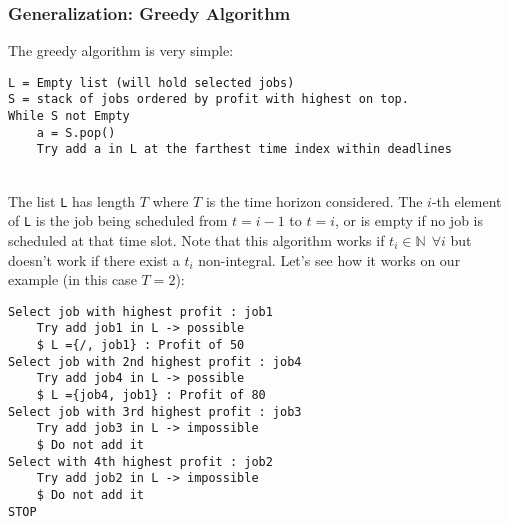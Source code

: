 %

\subsubsection{Generalization: Greedy Algorithm}

The greedy algorithm is very simple: \\[-5pt]

\begin{lstlisting}[style=pseudo]
L = Empty list (will hold selected jobs)
S = stack of jobs ordered by profit with highest on top.
While S not Empty
	a = S.pop()
	Try add a in L at the farthest time index within deadlines
\end{lstlisting} ~\\[-1.3cm]
The list \texttt{L} has length $T$ where $T$ is the time horizon considered. The $i$-th element of \texttt{L} is the job being scheduled from $t = i-1$ to $t = i$, or is empty if no job is scheduled at that time slot. Note that this algorithm works if $t_i \in \mathbb{N} \: \: \forall i$ but doesn’t work if there exist a $t_i$ non-integral. Let's see how it works on our example (in this case $T = 2$):

\vspace{-0.5cm}
\begin{lstlisting}[style=Classic]
Select job with highest profit : job1
	Try add job1 in L -> possible
	$ L ={/, job1} : Profit of 50
Select job with 2nd highest profit : job4
	Try add job4 in L -> possible
	$ L ={job4, job1} : Profit of 80
Select job with 3rd highest profit : job3
	Try add job3 in L -> impossible
	$ Do not add it
Select with 4th highest profit : job2
	Try add job2 in L -> impossible
	$ Do not add it
STOP
\end{lstlisting}


